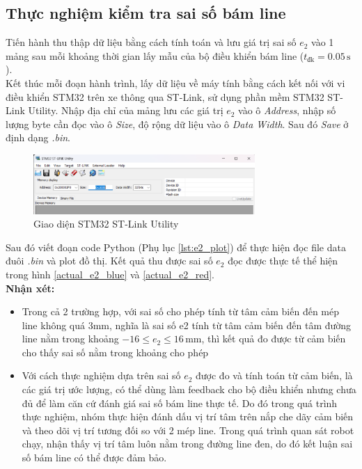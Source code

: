           \subsection{Thực nghiệm kiểm tra sai số bám line}
               \hspace*{0.6cm}Tiến hành thu thập dữ liệu bằng cách tính toán và lưu giá trị sai số $e_2$ vào 1 mảng sau mỗi khoảng thời gian lấy mẫu của bộ điều khiển bám line ($t_{\text{đk}} = 0.05 \,\mathrm{s}$).\\
               \hspace*{0.6cm}Kết thúc mỗi đoạn hành trình, lấy dữ liệu về máy tính bằng cách kết nối với vi điều khiển STM32 trên xe thông qua ST-Link, sử dụng phần mềm STM32 ST-Link Utility. Nhập địa chỉ của mảng lưu các giá trị $e_2$ vào ô \textit{Address}, nhập số lượng byte cần đọc vào ô \textit{Size}, độ rộng dữ liệu vào ô \textit{Data Width}. Sau đó \textit{Save} ở định dạng \textit{.bin}.
               \begin{figure}[H]
                    \centering
                    \includegraphics[width=0.75\textwidth]{pictures/chapter8/utility.png}
                    \caption{Giao diện STM32 ST-Link Utility}
                    \label{utility}
               \end{figure}
               \hspace*{0.6cm}Sau đó viết đoạn code Python (Phụ lục \ref{lst:e2_plot}) để thực hiện đọc file data đuôi \textit{.bin} và plot đồ thị. Kết quả thu được sai số $e_2$ đọc được thực tế thể hiện trong hình \ref{actual_e2_blue} và \ref{actual_e2_red}.\\
               \hspace*{0.6cm}\textbf{Nhận xét:}
               \begin{itemize}
                    \item Trong cả 2 trường hợp, với sai số cho phép tính từ tâm cảm biến đến mép line không quá 3mm, nghĩa là sai số e2 tính từ tâm cảm biến đến tâm đường line nằm trong khoảng $-16 \leq e_2 \leq 16 \,\mathrm{mm}$, thì kết quả đo được từ cảm biến cho thấy sai số nằm trong khoảng cho phép
                    \item Với cách thực nghiệm dựa trên sai số $e_2$ được đo và tính toán từ cảm biến, là các giá trị ước lượng, có thể dùng làm feedback cho bộ điều khiển nhưng chưa đủ để làm căn cứ đánh giá sai số bám line thực tế. Do 
                    đó trong quá trình thực nghiệm, nhóm thực hiện đánh dấu vị trí tâm trên nắp che dãy cảm biến và theo dõi vị trí tương đối so với 2 mép line. Trong quá trình quan sát robot chạy, nhận thấy vị trí tâm luôn nằm trong đường line đen, do đó kết luận sai số bám line có thể được đảm bảo.
               \end{itemize}
